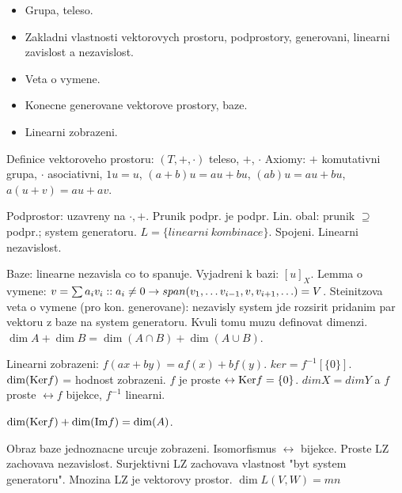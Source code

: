 \begin{understood}
	\begin{itemize}
	\item Grupa, teleso.
	\item Zakladni vlastnosti vektorovych prostoru, podprostory,
		generovani, linearni zavislost a nezavislost.
	\item Veta o vymene.
	\item Konecne generovane vektorove prostory, baze.
	\item Linearni zobrazeni.
	\end{itemize}
\end{understood}

Definice vektoroveho prostoru: $(T,+,\cdot)$ teleso, $+$, $\cdot$
Axiomy: $+$ komutativni grupa, $\cdot$ asociativni, $1u=u$, $(a+b)u=au+bu$,
$(ab)u=au+bu$, $a(u+v)=au+av$.

Podprostor: uzavreny na $\cdot,+$. Prunik podpr. je podpr.
Lin. obal: prunik $\supseteq$ podpr.; system generatoru.
$L=\{linearni\ kombinace\}$.
Spojeni.
Linearni nezavislost.

Baze: linearne nezavisla co to spanuje. Vyjadreni k bazi: $[u]_X$.
Lemma o vymene: $v=\sum a_i v_i:: a_i\neq 0\rightarrow span(v_1,\ldots
v_{i-1},v,v_{i+1},\ldots)=V$.
Steinitzova veta o vymene (pro kon. generovane): nezavisly system
jde rozsirit pridanim par vektoru z baze na system generatoru.
Kvuli tomu muzu definovat dimenzi. $\dim A+\dim B=\dim(A\cap B)+\dim(A\cup B)$.

Linearni zobrazeni: $f(ax+by)=af(x)+bf(y)$.
$ker=f^{-1}[\{0\}]$. $\dim(\mathrm{Ker} f)$ = hodnost zobrazeni.
$f$ je proste $\leftrightarrow \mathrm{Ker} f=\{0\}$.
$dim X=dim Y$ a $f$ proste $\leftrightarrow f$ bijekce, $f^{-1}$ linearni.

$\dim(\mathrm{Ker} f)+\dim(\mathrm{Im} f)=\dim(A)$.

Obraz baze jednoznacne urcuje zobrazeni.
Isomorfismus $\leftrightarrow$ bijekce.
Proste LZ zachovava nezavislost.
Surjektivni LZ zachovava vlastnost "byt system generatoru".
Mnozina LZ je vektorovy prostor.
$\dim L(V,W)=mn$
